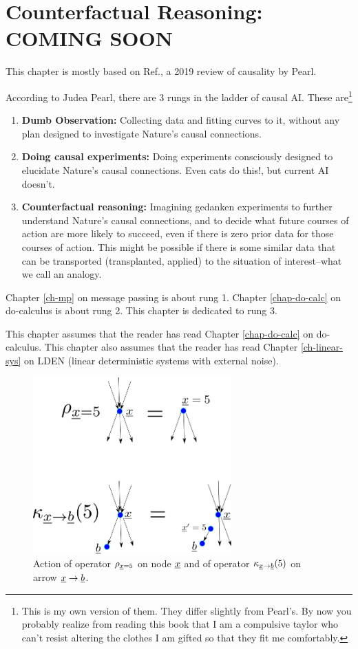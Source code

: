 \chapter{Counterfactual Reasoning: COMING SOON}
\label{ch-counterf}
This chapter is mostly based on 
Ref.\cite{pearl-2019review}, a 2019
 review of causality by Pearl.


According to 
Judea Pearl,
there are 3 rungs in the
ladder of causal AI.
These are\footnote{This is my
own version of them. They differ 
slightly from Pearl's.  By now
you probably realize 
from reading
this book that I am a compulsive taylor
who can't resist  
altering the clothes I am gifted  so that they fit
me comfortably.}
\begin{enumerate}
\item
{\bf Dumb Observation:} Collecting 
data
and fitting curves to it,
without any plan 
designed to
investigate Nature's 
causal connections.
\item {\bf Doing causal
experiments:} 
Doing experiments 
consciously designed to
elucidate
Nature's causal connections.
Even cats do this!, but current AI doesn't.
\item {\bf Counterfactual reasoning:}
Imagining gedanken experiments
to further understand
Nature's causal connections,
and to decide what future
courses of action are
more likely to succeed,
even if there is zero
prior data for 
those courses of action.
This might be possible if there
is some similar
data that can be transported
(transplanted, applied)
to the situation of
interest--what we call
an analogy.
\end{enumerate}
Chapter \ref{ch-mp}
on message passing
is about rung 1.
Chapter \ref{chap-do-calc}
on do-calculus is about rung 2.
This chapter is dedicated to rung 3.

This chapter
assumes that the reader
has read
Chapter \ref{chap-do-calc}
on do-calculus.
This chapter also 
assumes that the reader has read 
Chapter \ref{ch-linear-sys}  
on LDEN (linear 
deterministic systems
with external noise).


\begin{figure}[h!]
\centering
\includegraphics[width=3in]
{counterf/rho-kappa.png}
\caption{Action
of operator $\rho_{{\underline{x}}=5}$
on node ${\underline{x}}$
and of operator 
$\kappa_{{\underline{x}}\rightarrow {\underline{b}}}(5)$
on arrow ${\underline{x}}\rightarrow {\underline{b}}$.} 
\label{fig-rho-kappa}
\end{figure}

